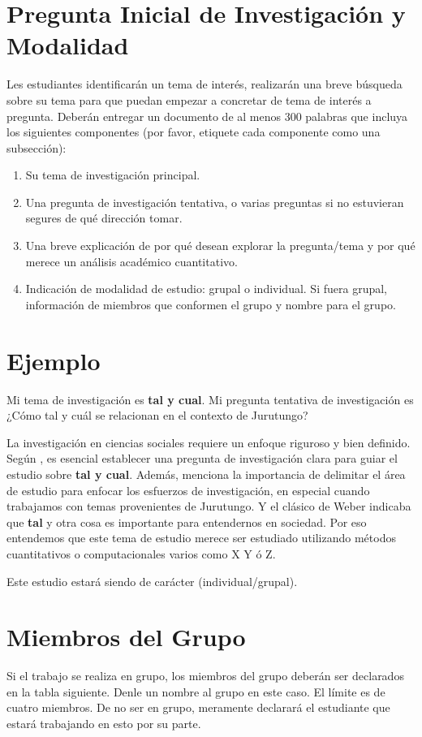 \documentclass[11pt]{article}
\begin{document}
\section*{Pregunta Inicial de Investigación y Modalidad}
Les estudiantes identificarán un tema de interés, realizarán una breve búsqueda sobre su tema para que puedan empezar a concretar de tema de interés a pregunta. Deberán entregar un documento de al menos 300 palabras que incluya los siguientes componentes (por favor, etiquete cada componente como una subsección):
\begin{enumerate}
    \item Su tema de investigación principal.
    \item Una pregunta de investigación tentativa, o varias preguntas si no estuvieran segures de qué dirección tomar.
    \item Una breve explicación de por qué desean explorar la pregunta/tema y por qué merece un análisis académico cuantitativo.
    \item Indicación de modalidad de estudio: grupal o individual. Si fuera grupal, información de miembros que conformen el grupo y nombre para el grupo.
\end{enumerate}

\section*{Ejemplo}
Mi tema de investigación es \textbf{tal y cual}. Mi pregunta tentativa de investigación es ¿Cómo tal y cuál se relacionan en el contexto de Jurutungo?

La investigación en ciencias sociales requiere un enfoque riguroso y bien definido. Según \citet{Perez2021}, es esencial establecer una pregunta de investigación clara para guiar el estudio sobre \textbf{tal y cual}. Además, \citet{Gonzalez2022} menciona la importancia de delimitar el área de estudio para enfocar los esfuerzos de investigación, en especial cuando trabajamos con temas provenientes de Jurutungo. Y el clásico de Weber indicaba que \textbf{tal} y otra cosa es importante \citep{Weber1964} para entendernos en sociedad. Por eso entendemos que este tema de estudio merece ser estudiado utilizando métodos cuantitativos o computacionales varios como X Y ó Z.

Este estudio estará siendo de carácter (individual/grupal).

\section*{Miembros del Grupo}
Si el trabajo se realiza en grupo, los miembros del grupo deberán ser declarados en la tabla siguiente. Denle un nombre al grupo en este caso. El límite es de cuatro miembros. De no ser en grupo, meramente declarará el estudiante que estará trabajando en esto por su parte.
\end{document}
